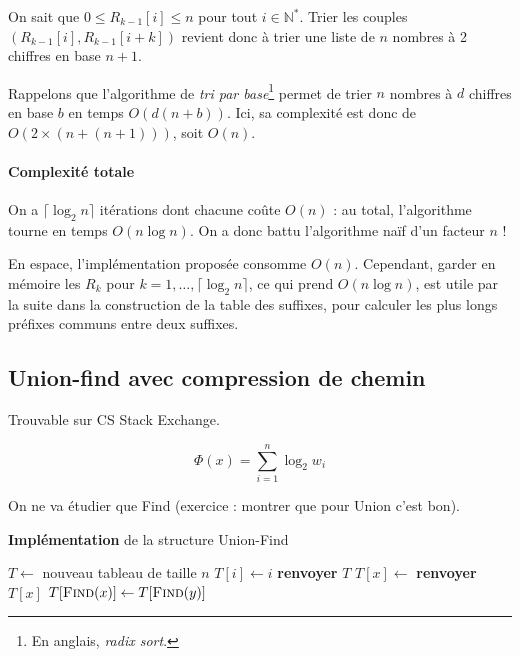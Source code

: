\documentclass[a4paper, 11pt]{article}
\def\N{\mathbb{N}}
\begin{document}
On sait que $0 \leq R_{k-1}[i] \leq n$ pour tout $i \in \N^*$. Trier les couples
$(R_{k-1}[i], R_{k-1}[i+k])$ revient donc à trier une liste de $n$ nombres à 2
chiffres en base $n+1$.

Rappelons que l'algorithme de \emph{tri par base}\footnote{En anglais,
  \emph{radix sort}.} permet de trier $n$ nombres à $d$ chiffres en base $b$ en
temps $O(d(n+b))$. Ici, sa complexité est donc de $O(2 \times (n + (n+1)))$,
soit $O(n)$.

\paragraph{Complexité totale}

On a $\lceil \log_2 n \rceil$ itérations dont chacune coûte $O(n)$ : au total,
l'algorithme tourne en temps $O(n \log n)$. On a donc battu l'algorithme naïf
d'un facteur $n$ !

En espace, l'implémentation proposée consomme $O(n)$. Cependant, garder en
mémoire les $R_k$ pour $k = 1, \ldots, \lceil \log_2 n \rceil$, ce qui prend
$O(n \log n)$, est utile par la suite dans la construction de la table des
suffixes, pour calculer les plus longs préfixes communs entre deux suffixes.


\newpage



\subsection{Union-find avec compression de chemin}

Trouvable sur CS Stack Exchange.

\[ \Phi(x) = \sum_{i=1}^n \log_2 w_i \]

On ne va étudier que Find (exercice : montrer que pour Union c'est bon).

\begin{algorithm}
\caption*{\textbf{Implémentation} de la structure Union-Find}
\begin{algorithmic}
\State $T \gets $ nouveau tableau de taille $n$
\State $T[i] \gets i$
\EndFor
\State \textbf{renvoyer} $T$
\EndProcedure
{}
$T[x] \gets $ 
\EndIf
\State \textbf{renvoyer} $T[x]$
\EndProcedure
{}
\State $T[\text{\Call{Find}{$x$}}] \gets T[\text{\Call{Find}{$y$}}]$
\EndProcedure
\end{algorithmic}
\end{algorithm}
\end{document}
